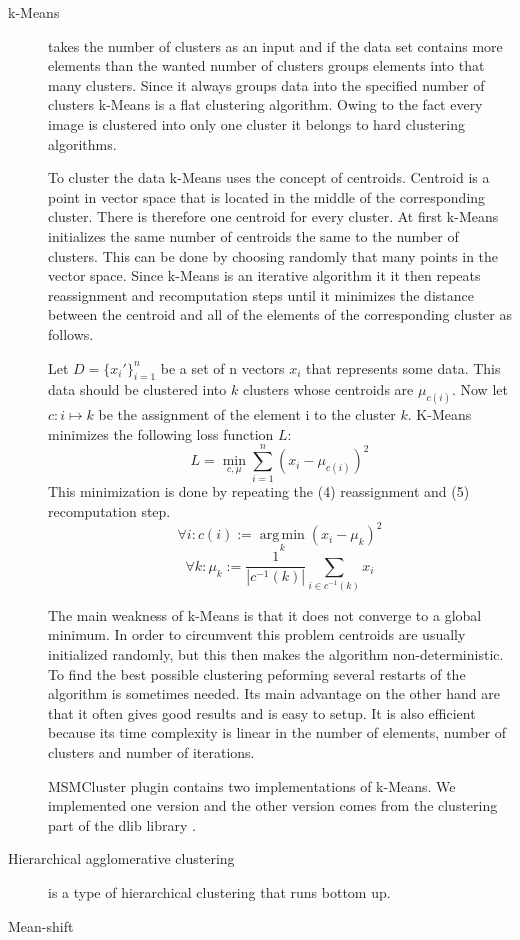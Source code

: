 \documentclass[journal]{vgtc}       %
\begin{document}
\begin{description}
\item [k-Means] takes the number of clusters as an input and if the data set contains more elements than the wanted number of clusters groups elements into that many clusters. Since it always groups data into the specified number of clusters k-Means is a flat clustering algorithm. Owing to the fact every image is clustered into only one cluster it belongs to hard clustering algorithms. 

To cluster the data k-Means uses the concept of centroids. Centroid is a point in vector space that is located in the middle of the corresponding cluster. There is therefore one centroid for every cluster. 
At first k-Means initializes the same number of centroids the same to the number of clusters. This can be done by choosing randomly that many points in the vector space. Since k-Means is an iterative algorithm it  it then repeats reassignment and recomputation steps until it minimizes the distance between the centroid and all of the elements of the corresponding cluster as follows. 

Let $D = \{x_i'\}_{i=1}^n$ be a set of n vectors $x_i$ that represents some data. This data should be clustered into $k$ clusters whose centroids are  $\mu_{c(i)}$. Now let $c: i \mapsto k$ be the assignment of the element i to the cluster $k$. 
K-Means minimizes the following loss function $L$:
\begin{equation}
L = \min_{c, \mu} \sum_{i=1}^{n}(x_i - \mu_{c(i)})^2
\end{equation} 
This minimization is done by repeating the (4) reassignment and (5) recomputation step.
\begin{equation}
\forall i: c(i) := \operatorname*{arg\,min}_k (x_i - \mu_k)^2
\end{equation}
\begin{equation}
\forall k: \mu_k := \frac{1}{|c^{-1}(k)|} \sum_{i \in c^{-1}(k)} x_i
\end{equation}


The main weakness of k-Means is that it does not converge to a global minimum. In order to circumvent this problem centroids are usually initialized randomly, but this then makes the algorithm non-deterministic. To find the best possible clustering peforming several restarts of the algorithm is sometimes needed.  Its main advantage on the other hand are that it often gives good results and is easy to setup. It is also efficient because its time complexity is linear in the number of elements, number of clusters and number of iterations.

MSMCluster plugin contains two implementations of k-Means. We implemented one version and the other version comes from the clustering part of the dlib library \cite{dlib09}.
\item [Hierarchical agglomerative clustering] is a type of hierarchical clustering that runs bottom up. 
\item [Mean-shift]
\end{description}
\end{document}
